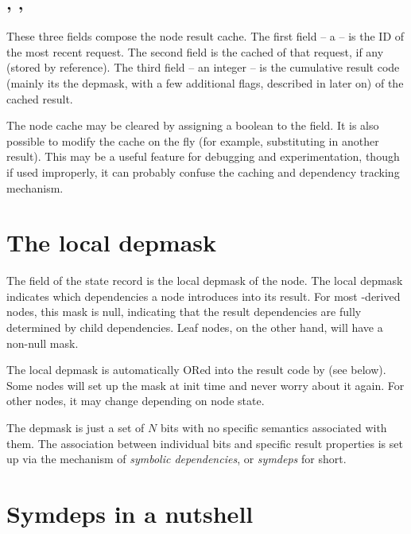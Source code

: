   \subsection{, , }
  
  These three fields compose the node result cache. The first field -- a
   -- is the ID of the most recent request. The second field is the
  cached  of that request, if any (stored by reference). The third
  field -- an integer -- is the cumulative result code (mainly its the depmask,
  with a few additional flags, described in  later on) of the
  cached result.

  The node cache may be cleared by assigning a boolean  to the
   field. It is also possible to modify the cache on the fly
  (for example, substituting in another result). This may be a useful feature
  for debugging and experimentation, though if used improperly, it can probably
  confuse the caching and dependency tracking mechanism.  


  
\section{The local depmask}
  
  The  field of the state record is the local depmask of the
  node. The local depmask indicates which dependencies a node introduces into
  its result. For most -derived nodes, this mask is null,
  indicating that the result dependencies are fully determined by child
  dependencies. Leaf nodes, on the other hand, will have a non-null mask.

  The local depmask is automatically ORed into the result code by
   (see below). Some nodes will set up the mask at init
  time and never worry about it again. For other nodes, it may change depending
  on node state.

  The depmask is just a set of $N$ bits with no specific semantics associated
  with them. The association between individual bits and specific result
  properties is set up via the mechanism of {\em symbolic dependencies}, or
  {\em symdeps} for short.
  
\section{Symdeps in a nutshell}
  
